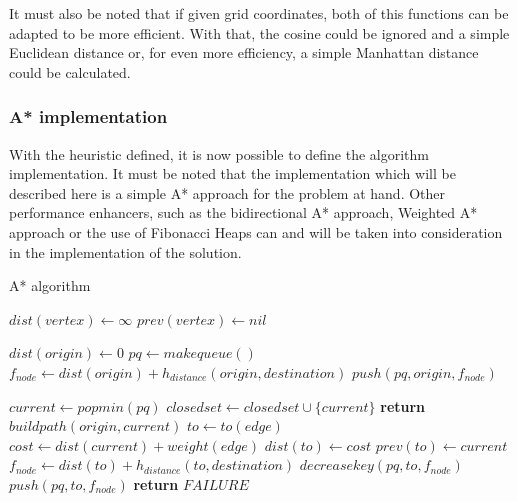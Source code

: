 \documentclass[a4paper, 12pt]{report}
\begin{document}
    It must also be noted that if given grid coordinates, both of this functions can be adapted to be more efficient. With that, the cosine could be ignored and a simple Euclidean distance or, for even more efficiency, a simple Manhattan distance could be calculated.
    
    \subsubsection{A* implementation}
    
    With the heuristic defined, it is now possible to define the algorithm implementation. It must be noted that the implementation which will be described here is a simple A* approach for the problem at hand. Other performance enhancers, such as the bidirectional A* approach, Weighted A* approach or the use of Fibonacci Heaps can and will be taken into consideration in the implementation of the solution.

    \begin{algorithm}[H]
        \label{alg:astar}
    	\caption{A* algorithm} 
	    \begin{algorithmic}[1]
		    \State $dist(vertex) \leftarrow \infty$
		    \State $prev(vertex) \leftarrow nil$
		\EndFor

		\State $dist(origin) \leftarrow 0$
		\State $pq \leftarrow makequeue()$
		\State $f_{node} \leftarrow dist(origin) + h_{distance}(origin, destination)$
		\State $push(pq, origin, f_{node})$ 
		\end{algorithmic}
	\end{algorithm}
	
	\pagebreak
	\begin{algorithm}[H]
	    \begin{algorithmic}[1]
		    \State $current \leftarrow popmin(pq)$
		    \State $closedset \leftarrow closedset \cup \{current\}$
		        \State \textbf{return} $buildpath(origin, current)$
		    \EndIf
		        \State $to \leftarrow to(edge)$
		        \State $cost \leftarrow dist(current) + weight(edge)$
    	            \State $dist(to) \leftarrow cost$
    	            \State $prev(to) \leftarrow current$
    	            \State $f_{node} \leftarrow dist(to) + h_{distance}(to, destination)$
    	                \State $decreasekey(pq, to, f_{node})$
    	            \Else
    	                \State $push(pq, to, f_{node})$
    	            \EndIf
    	         \EndIf
		    \EndFor
		\EndWhile
		\State \textbf{return} $FAILURE$
		\end{algorithmic}
	\end{algorithm}
    
\end{document}

